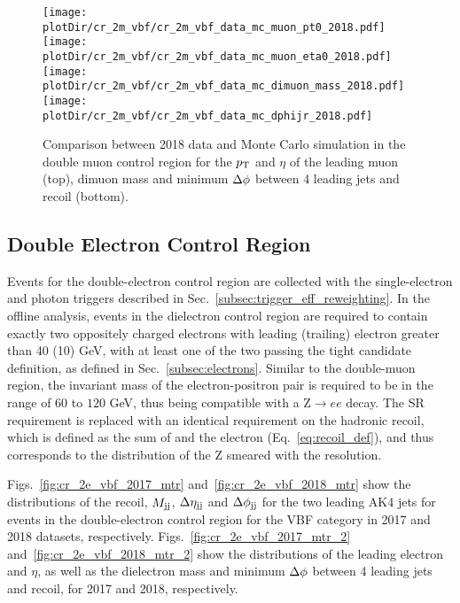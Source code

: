 \begin{figure}[htbp]
    \begin{center}
        \texttt{[image: \\plotDir/cr\_2m\_vbf/cr\_2m\_vbf\_data\_mc\_muon\_pt0\_2018.pdf]}
        \texttt{[image: \\plotDir/cr\_2m\_vbf/cr\_2m\_vbf\_data\_mc\_muon\_eta0\_2018.pdf]}
        \texttt{[image: \\plotDir/cr\_2m\_vbf/cr\_2m\_vbf\_data\_mc\_dimuon\_mass\_2018.pdf]}
        \texttt{[image: \\plotDir/cr\_2m\_vbf/cr\_2m\_vbf\_data\_mc\_dphijr\_2018.pdf]}
    \end{center}
    \caption{Comparison between 2018 data and Monte Carlo simulation in the double muon control region for
        the $p_{\textrm{T}}$ and $\eta$ of the leading muon (top), dimuon mass and minimum $\Delta \phi$ between 4 leading jets and recoil (bottom).}
    \label{fig:cr_2m_vbf_2018_mtr_2}
\end{figure}

\clearpage

\subsection{Double Electron Control Region}
\label{sec:selection_cr_2e}

Events for the double-electron control region are collected with the single-electron and 
photon triggers described in Sec.~\ref{subsec:trigger_eff_reweighting}. In the offline analysis, events in the dielectron 
control region are required to contain exactly two oppositely charged electrons with leading (trailing) 
electron \pt greater than 40 (10) GeV, with at least one of the two passing the tight candidate definition, as defined in Sec.~\ref{subsec:electrons}.
Similar to the double-muon region, the invariant mass of the electron-positron pair is required to be in the range of $60$ to $120$ GeV,
thus being compatible with a $\textrm{Z} \rightarrow ee$ decay. 
The SR \ptmiss requirement is replaced with an identical requirement on the hadronic recoil, which is defined as the 
sum of \ptvecmiss and the electron \vpt (Eq.~\ref{eq:recoil_def}), and thus corresponds to the distribution of the Z \pt smeared with the \ptmiss resolution. 

Figs.~\ref{fig:cr_2e_vbf_2017_mtr} and~\ref{fig:cr_2e_vbf_2018_mtr} show the distributions of the recoil, $M_{\textrm{jj}}$, $\Delta \eta_{\textrm{jj}}$ and
$\Delta \phi_{\textrm{jj}}$ for the two leading AK4 jets for events in the double-electron control region for the VBF category 
in 2017 and 2018 datasets, respectively. 
Figs.~\ref{fig:cr_2e_vbf_2017_mtr_2} and~\ref{fig:cr_2e_vbf_2018_mtr_2} show the distributions of the leading electron \pt and $\eta$, 
as well as the dielectron mass and minimum $\Delta \phi$ between 4 leading jets and recoil, for 2017 and 2018, respectively.

